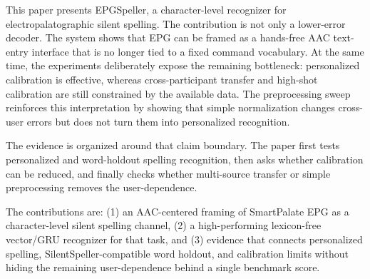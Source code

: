 
This paper presents EPGSpeller, a character-level recognizer for electropalatographic silent spelling. The contribution is not only a lower-error decoder. The system shows that EPG can be framed as a hands-free AAC text-entry interface that is no longer tied to a fixed command vocabulary. At the same time, the experiments deliberately expose the remaining bottleneck: personalized calibration is effective, whereas cross-participant transfer and high-shot calibration are still constrained by the available data. The preprocessing sweep reinforces this interpretation by showing that simple normalization changes cross-user errors but does not turn them into personalized recognition.


The evidence is organized around that claim boundary. The paper first tests personalized and word-holdout spelling recognition, then asks whether calibration can be reduced, and finally checks whether multi-source transfer or simple preprocessing removes the user-dependence.


The contributions are: (1) an AAC-centered framing of SmartPalate EPG as a character-level silent spelling channel, (2) a high-performing lexicon-free vector/GRU recognizer for that task, and (3) evidence that connects personalized spelling, SilentSpeller-compatible word holdout, and calibration limits without hiding the remaining user-dependence behind a single benchmark score.

